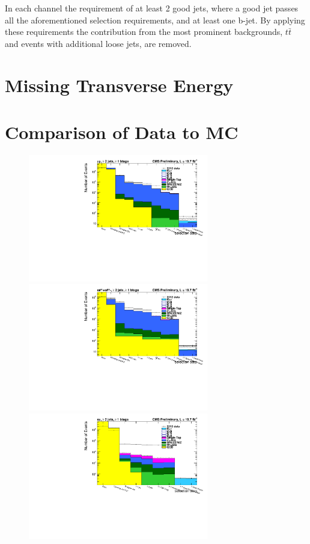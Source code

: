  In each channel the requirement of at least 2 good jets, where a good jet passes all the aforementioned selection requirements, and at least one b-jet. By applying these requirements the contribution from the most prominent backgrounds, $t\bar{t}$ and events with additional loose jets, are removed. 
 
\section{Missing Transverse Energy} \label{sec-METSelection}



\section{Comparison of Data to MC} \label{sec-dataMCcomparison}

\begin{figure}
\begin{center}
\includegraphics[width=0.7\textwidth]{Plots/ControlPlots/CutFlow/Log/TTbarMuMuRefSelection.pdf}
\includegraphics[width=0.7\textwidth]{Plots/ControlPlots/CutFlow/Log/TTbarEERefSelection.pdf}
\includegraphics[width=0.7\textwidth]{Plots/ControlPlots/CutFlow/Log/TTbarEMuRefSelection.pdf}
\end{center}
\end{figure}

